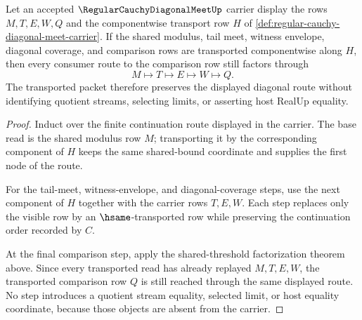 \begin{theorem}
\label{thm:regular-cauchy-diagonal-meet-transport-induction}
Let an accepted $\RegularCauchyDiagonalMeetUp$ carrier display the rows $M,T,E,W,Q$ and the componentwise transport row $H$ of \autoref{def:regular-cauchy-diagonal-meet-carrier}. If the shared modulus, tail meet, witness envelope, diagonal coverage, and comparison rows are transported componentwise along $H$, then every consumer route to the comparison row still factors through
$$
M \longmapsto T \longmapsto E \longmapsto W \longmapsto Q.
$$
The transported packet therefore preserves the displayed diagonal route without identifying quotient streams, selecting limits, or asserting host RealUp equality.
\end{theorem}
\begin{proof}
Induct over the finite continuation route displayed in the carrier. The base read is the shared modulus row $M$; transporting it by the corresponding component of $H$ keeps the same shared-bound coordinate and supplies the first node of the route.

For the tail-meet, witness-envelope, and diagonal-coverage steps, use the next component of $H$ together with the carrier rows $T,E,W$. Each step replaces only the visible row by an $\hsame$-transported row while preserving the continuation order recorded by $C$.

At the final comparison step, apply the shared-threshold factorization theorem above. Since every transported read has already replayed $M,T,E,W$, the transported comparison row $Q$ is still reached through the same displayed route. No step introduces a quotient stream equality, selected limit, or host equality coordinate, because those objects are absent from the carrier.
\end{proof}

